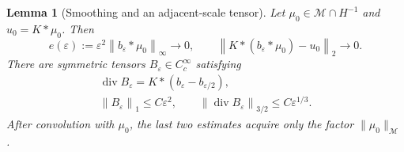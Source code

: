 \documentclass[11pt,a4paper,reqno]{amsart}
\theoremstyle{plain}
\newtheorem{lemma}[theorem]{Lemma}
\theoremstyle{definition}
\theoremstyle{remark}
\numberwithin{equation}{section}
\newcommand{\M}{\mathcal M}
\newcommand{\Div}{\operatorname{div}}
\newcommand{\norm}[2]{\left\|#1\right\|_{#2}}
\begin{document}
\begin{lemma}[Smoothing and an adjacent-scale tensor]\label{lem:smoothing}
Let $\mu_0\in\M\cap H^{-1}$ and $u_0=K*\mu_0$. Then
\begin{equation}\label{eq:smoothing-limits}
 e(\varepsilon):=\varepsilon^2\norm{b_\varepsilon*\mu_0}\infty
 \longrightarrow0,
 \qquad
 \norm{K*(b_\varepsilon*\mu_0)-u_0}2\longrightarrow0.
\end{equation}
There are symmetric tensors $B_\varepsilon\in C_c^\infty$ satisfying
\begin{equation}\label{eq:adjacent-tensor}
 \begin{gathered}
 \Div B_\varepsilon=K*(b_\varepsilon-b_{\varepsilon/2}),\\
 \norm{B_\varepsilon}1\le C\varepsilon^2,
 \qquad
 \norm{\Div B_\varepsilon}{3/2}\le C\varepsilon^{1/3}.
 \end{gathered}
\end{equation}
After convolution with $\mu_0$, the last two estimates acquire only the
factor $\|\mu_0\|_{\M}$.
\end{lemma}
\end{document}
